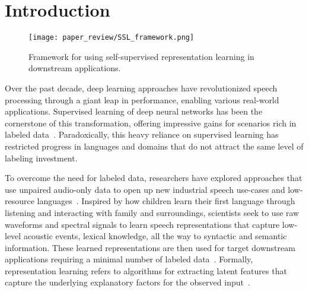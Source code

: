 

\section{Introduction}

\begin{figure}
    \centering
    \texttt{[image: paper\_review/SSL\_framework.png]}
	 \caption{Framework for using self-supervised representation learning in
	 downstream applications.}
    \label{fig:SSL_framework}
\end{figure}


Over the past decade, deep learning approaches have revolutionized speech processing
through a giant leap in performance, enabling various real-world applications.
Supervised learning of deep neural networks has been the cornerstone of this
transformation, offering impressive gains for scenarios rich in labeled
data~\cite{lecun_deep_2015,hinton_deep_2012,bourlard_connectionist_1994}. 
Paradoxically, this heavy reliance on supervised learning has restricted progress in
languages and domains that do not attract the same level of labeling
investment. 

To overcome the need for labeled data, researchers have explored approaches that use
unpaired audio-only data to open up new industrial speech use-cases and
low-resource languages~\cite{kemp_unsupervised_1999, lamel_lightly_2002, ma_unsupervised_2006}. Inspired by how
children learn their first language through listening and interacting with
family and surroundings, scientists seek to use raw waveforms and
spectral signals to learn speech representations that capture low-level
acoustic events, lexical knowledge, all the way to syntactic and semantic
information. These learned representations are then used for target downstream
applications requiring a minimal number of labeled data~\cite{hinton_learning_2007,
lecun_tutorial_2006, bengio_representation_2013}. 
Formally, representation learning refers to algorithms for extracting latent
features that capture the underlying explanatory factors for the observed
input~\cite{bengio_representation_2013}. 

